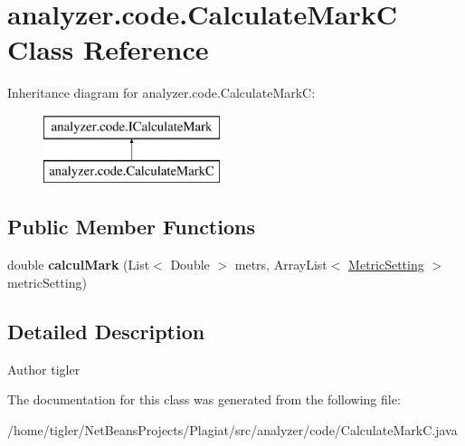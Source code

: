 \hypertarget{classanalyzer_1_1code_1_1CalculateMarkC}{}\section{analyzer.\+code.\+Calculate\+MarkC Class Reference}
\label{classanalyzer_1_1code_1_1CalculateMarkC}
Inheritance diagram for analyzer.\+code.\+Calculate\+MarkC\+:\begin{figure}[H]
\begin{center}
\leavevmode
\includegraphics[height=2.000000cm]{classanalyzer_1_1code_1_1CalculateMarkC}
\end{center}
\end{figure}
\subsection*{Public Member Functions}
\begin{DoxyCompactItemize}
\item 
\mbox{\label{classanalyzer_1_1code_1_1CalculateMarkC_ac94f8cd39b8581d49c98c0290a292ab7}} 
double {\bfseries calcul\+Mark} (List$<$ Double $>$ metrs, Array\+List$<$ \hyperlink{classanalyzer_1_1code_1_1MetricSetting}{Metric\+Setting} $>$ metric\+Setting)
\end{DoxyCompactItemize}


\subsection{Detailed Description}
\begin{DoxyAuthor}{Author}
tigler 
\end{DoxyAuthor}


The documentation for this class was generated from the following file\+:\begin{DoxyCompactItemize}
\item 
/home/tigler/\+Net\+Beans\+Projects/\+Plagiat/src/analyzer/code/Calculate\+Mark\+C.\+java\end{DoxyCompactItemize}

